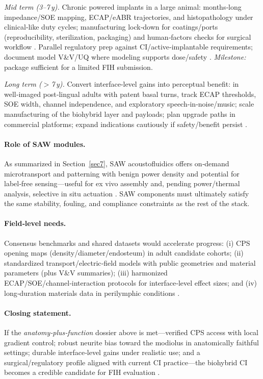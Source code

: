 \documentclass[referee,pdflatex, sn-vancouver-num]{sn-jnl}%
\theoremstyle{thmstyleone}%
\theoremstyle{thmstyletwo}%
\theoremstyle{thmstylethree}%
\begin{document}
\textit{Mid term (3–7\,y).} Chronic powered implants in a large animal: months‑long impedance/SOE mapping, ECAP/eABR trajectories, and histopathology under clinical‑like duty cycles; manufacturing lock‑down for coatings/ports (reproducibility, sterilization, packaging) and human‑factors checks for surgical workflow \cite{Dalrymple2020,Horne2023,Rebscher2008}. Parallel regulatory prep against CI/active‑implantable requirements; document model V\&V/UQ where modeling supports dose/safety \cite{ISO14708-7:2016_CI,USFDA2021InSilico,ASMEVV40_2018}. \textit{Milestone:} package sufficient for a limited FIH submission.

\textit{Long term ($>\!$7\,y).} Convert interface‑level gains into perceptual benefit: in well‑imaged post‑lingual adults with patent basal turns, track ECAP thresholds, SOE width, channel independence, and exploratory speech‑in‑noise/music; scale manufacturing of the biohybrid layer and payloads; plan upgrade paths in commercial platforms; expand indications cautiously if safety/benefit persist \cite{wilson2008,wilson2014}.

\paragraph{Role of SAW modules.}
As summarized in Section~\ref{sec7}, SAW acoustofluidics offers on‑demand microtransport and patterning with benign power density and potential for label‑free sensing—useful for ex vivo assembly and, pending power/thermal analysis, selective in situ actuation \cite{Friend2011,Ding2013,rufo2022,Agostini2021_UHFSAW}. SAW components must ultimately satisfy the same stability, fouling, and compliance constraints as the rest of the stack.

\paragraph{Field‑level needs.}
Consensus benchmarks and shared datasets would accelerate progress: (i) CPS opening maps (density/diameter/endosteum) in adult candidate cohorts; (ii) standardized transport/electric‑field models with public geometries and material parameters (plus V\&V summaries); (iii) harmonized ECAP/SOE/channel‑interaction protocols for interface‑level effect sizes; and (iv) long‑duration materials data in perilymphic conditions \cite{Vecchi2024,SaltPlontke2009}. 

\paragraph{Closing statement.}
If the \emph{anatomy‑plus‑function} dossier above is met—verified CPS{} access with local gradient control; robust neurite bias toward the modiolus in anatomically faithful settings; durable interface‑level gains under realistic use; and a surgical/regulatory profile aligned with current CI practice—the biohybrid CI becomes a credible candidate for FIH evaluation \cite{raskandersen2006,Micco2006,wilson2008,ISO14708-7:2016_CI}.



\end{document}
